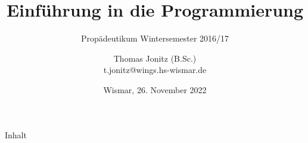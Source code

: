 \documentclass{hswbeamer}
\title[EiP]{Einführung in die Programmierung}
\subtitle[WS 2016/17]{Propädeutikum Wintersemester 2016/17}
\author[\Copyright{Thomas Jonitz}]{Thomas Jonitz (B.Sc.)\\\small{t.jonitz@wings.hs-wismar.de}}
\date{Wismar, 26. November 2022}
\begin{document}


\begin{frame}
    \maketitle
\end{frame}

\begin{frame}{Inhalt}
    \tableofcontents
\end{frame}


%



\end{document}
